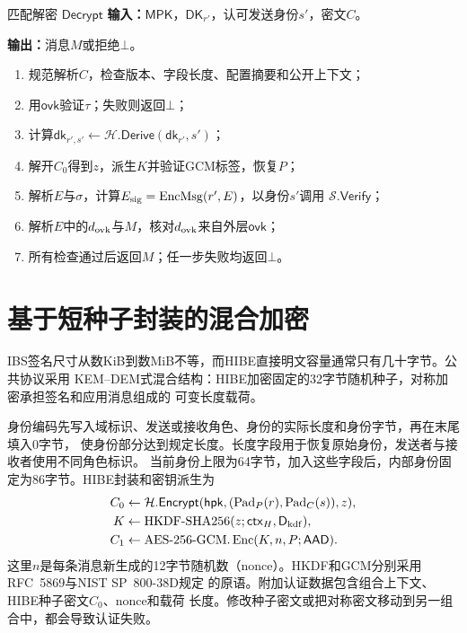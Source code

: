 \begin{ibmealgorithm}{匹配解密 $\mathsf{Decrypt}$}
\label{alg:decrypt}
\textbf{输入：}$\mathsf{MPK}$，$\mathsf{DK}_{r'}$，认可发送身份$s'$，密文$C$。\par
\textbf{输出：}消息$M$或拒绝$\bot$。
\begin{enumerate}
  \item 规范解析$C$，检查版本、字段长度、配置摘要和公开上下文；
  \item 用$\mathsf{ovk}$验证$\tau$；失败则返回$\bot$；
  \item 计算$\mathsf{dk}_{r',s'}\leftarrow\mathcal H.\mathsf{Derive}(\mathsf{dk}_{r'},s')$；
  \item 解开$C_0$得到$z$，派生$K$并验证GCM标签，恢复$P$；
  \item 解析$E$与$\sigma$，计算$E_{\rm sig}=\operatorname{EncMsg}(r',E)$，以身份$s'$调用
        $\mathcal S.\mathsf{Verify}$；
  \item 解析$E$中的$d_{\rm ovk}$与$M$，核对$d_{\rm ovk}$来自外层$\mathsf{ovk}$；
  \item 所有检查通过后返回$M$；任一步失败均返回$\bot$。
\end{enumerate}
\end{ibmealgorithm}

\section{基于短种子封装的混合加密}

IBS签名尺寸从数KiB到数MiB不等，而HIBE直接明文容量通常只有几十字节。公共协议采用
KEM--DEM式混合结构：HIBE加密固定的32字节随机种子，对称加密承担签名和应用消息组成的
可变长度载荷。

身份编码先写入域标识、发送或接收角色、身份的实际长度和身份字节，再在末尾填入0字节，
使身份部分达到规定长度。长度字段用于恢复原始身份，发送者与接收者使用不同角色标识。
当前身份上限为64字节，加入这些字段后，内部身份固定为86字节。HIBE封装和密钥派生为
\begin{align*}
 C_0&\leftarrow\mathcal H.\mathsf{Encrypt}
       (\mathsf{hpk},(\operatorname{Pad}_P(r),\operatorname{Pad}_C(s)),z),\\
 K&\leftarrow\operatorname{HKDF\text{-}SHA256}(z;\mathsf{ctx}_H,\mathsf D_{\rm kdf}),\\
 C_1&\leftarrow\operatorname{AES\text{-}256\text{-}GCM.Enc}(K,n,P;\mathsf{AAD}).
\end{align*}
这里$n$是每条消息新生成的12字节随机数（nonce）。HKDF和GCM分别采用RFC~5869与NIST SP~800-38D规定
的原语\cite{rfc5869,nist2007gcm}。附加认证数据包含组合上下文、HIBE种子密文$C_0$、nonce和载荷
长度。修改种子密文或把对称密文移动到另一组合中，都会导致认证失败。

